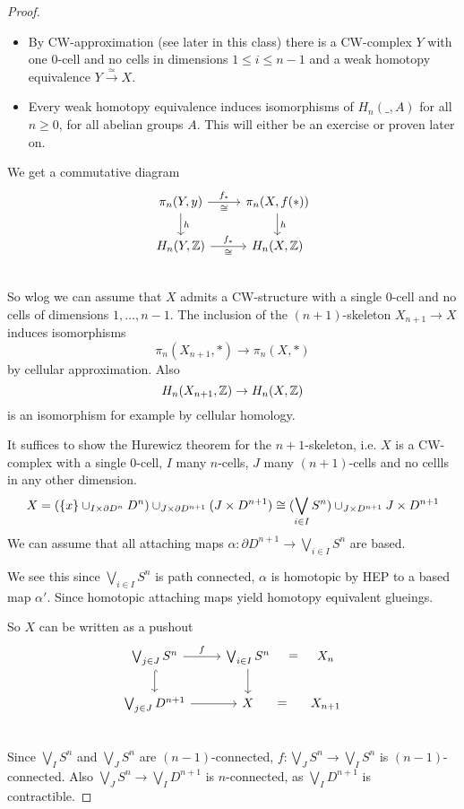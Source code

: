 \documentclass[language=english]{TemplateLecture}
\begin{document}
\begin{proof}
    \begin{itemize}
        \item By CW-approximation (see later in this class) there is a CW-complex \(Y\) with one \(0\)-cell and no cells in dimensions \(1\leq i \leq n-1\) and a weak homotopy equivalence \(Y\xrightarrow{\simeq} X\).
        \item Every weak homotopy equivalence induces isomorphisms of \(H_n(\_, A)\) for all \(n \geq 0\), for all abelian groups \(A\). This will either be an exercise or proven later on.
    \end{itemize}
    We get a commutative diagram
    \[\begin{tikzcd}
        \pi_n(Y, y) \ar[r, "f_*", "\cong"'] \ar[d, "h"] & \pi_n(X,f(*)) \ar[d, "h"] \\
        H_n(Y, \iz) \ar[r, "f_*", "\cong"'] & H_n(X,\iz) \\
    \end{tikzcd}\]
    So wlog we can assume that \(X\) admits a CW-structure with a single \(0\)-cell and no cells of dimensions \(1, \dots, n-1\). The inclusion of the \((n+1)\)-skeleton \(X_{n+1} \to X\) induces isomorphisms
    \[\pi_n(X_{n+1}, *) \to \pi_n(X, *)\]
    by cellular approximation. Also
    \[H_n(X_{n+1}, \mathbb{Z}) \to H_n(X,\mathbb{Z})\]
    is an isomorphism for example by cellular homology.

    It suffices to show the Hurewicz theorem for the \(n+1\)-skeleton, i.e. \(X\) is a CW-complex with a single \(0\)-cell, \(I\) many \(n\)-cells, \(J\) many \((n+1)\)-cells and no cellls in any other dimension.
    \[X= (\{x\} \cup_{I\times \partial D^n} D^n) \cup_{J\times \partial D^{n+1}} (J\times D^{n+1}) \cong (\bigvee_{i\in I} S^n) \cup_{J\times D^{n+1}} J\times D^{n+1}\]
    We can assume that all attaching maps \(\alpha\colon \partial D^{n+1}\to \bigvee_{i \in I} S^n\) are based.

    We see this since \(\bigvee_{i\in I} S^n\) is path connected, \(\alpha\) is homotopic by HEP to a based map \(\alpha'\). Since homotopic attaching maps yield homotopy equivalent glueings.

    So \(X\) can be written as a pushout
    \[\begin{tikzcd}
        \bigvee_{j\in J} S^n \ar[r, "f"]\ar[d, hook] & \bigvee_{i \in I} S^n  \ar[d]\ar[r, phantom, "="] & X_n \\
        \bigvee_{j \in J} D^{n+1} \ar[r] & X \ar[r, phantom, "="] & X_{n+1}\\
    \end{tikzcd}\]
    Since \(\bigvee_I S^n\) and \(\bigvee_J S^n\) are \((n-1)\)-connected, \(f\colon \bigvee_J S^n \to \bigvee_I S^n\) is \((n-1)\)-connected. Also \(\bigvee_J S^n \to \bigvee_I D^{n+1}\) is \(n\)-connected, as \(\bigvee_I D^{n+1}\) is contractible.


\end{proof}
\end{document}
